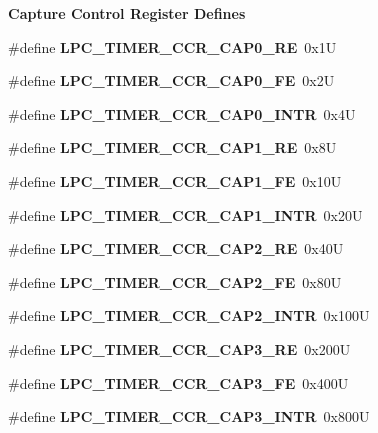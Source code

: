 \begin{Indent}\textbf{ Capture Control Register Defines}\par
\begin{DoxyCompactItemize}
\item 
\#define {\bfseries L\+P\+C\+\_\+\+T\+I\+M\+E\+R\+\_\+\+C\+C\+R\+\_\+\+C\+A\+P0\+\_\+\+RE}~0x1U
\item 
\#define {\bfseries L\+P\+C\+\_\+\+T\+I\+M\+E\+R\+\_\+\+C\+C\+R\+\_\+\+C\+A\+P0\+\_\+\+FE}~0x2U
\item 
\#define {\bfseries L\+P\+C\+\_\+\+T\+I\+M\+E\+R\+\_\+\+C\+C\+R\+\_\+\+C\+A\+P0\+\_\+\+I\+N\+TR}~0x4U
\item 
\#define {\bfseries L\+P\+C\+\_\+\+T\+I\+M\+E\+R\+\_\+\+C\+C\+R\+\_\+\+C\+A\+P1\+\_\+\+RE}~0x8U
\item 
\#define {\bfseries L\+P\+C\+\_\+\+T\+I\+M\+E\+R\+\_\+\+C\+C\+R\+\_\+\+C\+A\+P1\+\_\+\+FE}~0x10U
\item 
\#define {\bfseries L\+P\+C\+\_\+\+T\+I\+M\+E\+R\+\_\+\+C\+C\+R\+\_\+\+C\+A\+P1\+\_\+\+I\+N\+TR}~0x20U
\item 
\#define {\bfseries L\+P\+C\+\_\+\+T\+I\+M\+E\+R\+\_\+\+C\+C\+R\+\_\+\+C\+A\+P2\+\_\+\+RE}~0x40U
\item 
\#define {\bfseries L\+P\+C\+\_\+\+T\+I\+M\+E\+R\+\_\+\+C\+C\+R\+\_\+\+C\+A\+P2\+\_\+\+FE}~0x80U
\item 
\#define {\bfseries L\+P\+C\+\_\+\+T\+I\+M\+E\+R\+\_\+\+C\+C\+R\+\_\+\+C\+A\+P2\+\_\+\+I\+N\+TR}~0x100U
\item 
\#define {\bfseries L\+P\+C\+\_\+\+T\+I\+M\+E\+R\+\_\+\+C\+C\+R\+\_\+\+C\+A\+P3\+\_\+\+RE}~0x200U
\item 
\#define {\bfseries L\+P\+C\+\_\+\+T\+I\+M\+E\+R\+\_\+\+C\+C\+R\+\_\+\+C\+A\+P3\+\_\+\+FE}~0x400U
\item 
\#define {\bfseries L\+P\+C\+\_\+\+T\+I\+M\+E\+R\+\_\+\+C\+C\+R\+\_\+\+C\+A\+P3\+\_\+\+I\+N\+TR}~0x800U
\end{DoxyCompactItemize}
\end{Indent}
